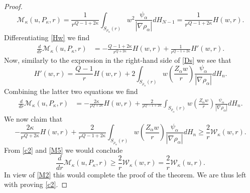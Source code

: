 \documentclass[11pt]{amsart}
\theoremstyle{plain}
\numberwithin{equation}{section}
\begin{document}
\begin{proof}
\begin{equation}\label{Hw}
\mathcal M_\kappa(u,P_\kappa,r) = \frac{1}{r^{Q-1+2\kappa}} \int_{{S_{\rho_\alpha}(r)}}  w^2 \frac{\psi_\alpha}{|\nabla {\rho_\alpha}|}dH_{N-1} = \frac{1}{r^{Q-1+2\kappa}} H(w,r).
\end{equation}
Differentiating \eqref{Hw} we find
\begin{align*}
\frac{d}{dr} \mathcal M_\kappa(u,P_\kappa,r) & = - \frac{Q-1+2\kappa}{r^{Q+2\kappa}} H(w,r)
 +  \frac{1}{r^{Q-1+2\kappa}} H'(w,r).
\end{align*}
Now, similarly to the expression in the right-hand side of \eqref{Ds} we see that
\[
H'(w,r)  = \frac{Q-1}{r} H(w,r)  + 2 \int_{S_{\rho_\alpha}(r)} w\left(\frac{Z_\alpha w}{r}\right)\frac{\psi_\alpha}{|\nabla {\rho_\alpha}|}dH_{n}.
\]
Combining the latter two equations we find
\begin{align*}
\frac{d}{dr} \mathcal M_\kappa(u,P_\kappa,r) & = - \frac{2\kappa}{r^{Q+2\kappa}} H(w,r) + \frac{2}{r^{Q-1+2\kappa}} \int_{S_{\rho_\alpha}(r)} w\left(\frac{Z_\alpha w}{r}\right)\frac{\psi_\alpha}{|\nabla {\rho_\alpha}|}dH_{n}.
\end{align*}
We now claim that
\begin{equation}\label{c2}
- \frac{2\kappa}{r^{Q+2\kappa}} H(w,r) + \frac{2}{r^{Q-1+2\kappa}} \int_{S_{\rho_\alpha}(r)} w\left(\frac{Z_\alpha w}{r}\right)\frac{\psi_\alpha}{|\nabla {\rho_\alpha}|}dH_{n} \ge \frac 2r \mathcal W_\kappa(w,r).
\end{equation}
From \eqref{c2} and \eqref{M5} we would conclude
\[
\frac{d}{dr} \mathcal M_\kappa(u,P_\kappa,r)  \ge \frac 2r \mathcal W_\kappa(w,r) = \frac 2r \mathcal W_\kappa(u,r).
\]
In view of \eqref{M2} this would complete the proof of the theorem.
We are thus left with proving \eqref{c2}.


\end{proof}
\end{document}
